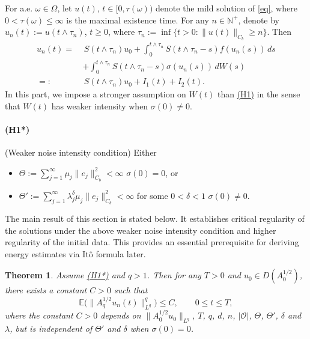 \documentclass[10pt]{article}
\numberwithin{figure}{section}
\numberwithin{equation}{section}
\newtheorem{theorem}{Theorem}[section]
\newcommand{\0}{{\theta}}
\def\w{\omega}
\def\W{\Omega}
\def\8{\infty}
\begin{document}
For a.e. $\w\in\W$, let $u(t)$, $t\in[0,\tau(\w))$ denote the mild solution of \eqref{eq}, where $0<\tau(\w)\le\8$  is  the maximal existence time. For any $n\in \mathbb{N}^+$, denote by $u_n(t):=u(t\wedge\tau_n)$, $t\ge0$, where $\tau_n := \inf\{t > 0 : \|u(t)\|_{C_b} \geq n\}$. Then 
\begin{equation}\label{eq1.1}
\begin{split}u_n(t) =\,&\,S(t\wedge\tau_n)u_0 + \int_0^{t\wedge\tau_n} S(t\wedge\tau_n-s)f(u_n(s))\,ds\\
&+ \int_0^{t\wedge\tau_n} S(t\wedge\tau_n-s)\sigma(u_n(s))\,dW(s)\\
=:&\,S(t\wedge\tau_n)u_0 +I_1(t)+I_2(t).\end{split}\end{equation}
\vs
In this part, we impose a stronger assumption on $W(t)$ than \hyperref[H1]{(H1)} in the sense that $W(t)$ has weaker intensity when $\sigma(0) \neq 0$.
\hypertarget{H}{}\paragraph{(H1*)} \label{H1*} (Weaker noise intensity condition) Either
\begin{itemize}
    \item $\displaystyle \Theta:=\sum_{j=1}^\infty \mu_j\|e_j\|_{C_b}^2<\infty$ \quad{}\quad $\sigma(0)=0$, or
    \item$\displaystyle \Theta':=\sum_{j=1}^\infty \lambda_j^\delta \mu_j\|e_j\|_{C_b}^2<\infty$ for some $0<\delta<1$ \quad{}\quad $\sigma(0)\ne0$.
\end{itemize}


The main result of this section is stated below. It establishes critical regularity of the solutions under the above weaker noise intensity condition and higher regularity of the initial data. This provides an essential prerequisite for deriving energy estimates via It\^o formula later.

\begin{theorem}\label{th2}
Assume \hyperref[H1*]{(H1*)} and $q>1$. Then for any $T>0$ and $u_0\in D(A_0^{1/2})$, there exists a constant $C>0$ such that
$$
\mathbb{E}\big(\|A_q^{1/2}u_n(t)\|_{L^q}^q\big) \le C,\qquad 0\le t\le T,
$$
where the constant $C>0$ depends on $\|A_0^{1/2}u_0\|_{L^q}$, $T$, $q$, $d$, $n$, $|\mathcal O|$, $\Theta$, $\Theta'$, $\delta$ and $\lambda$, but is independent of $\Theta'$ and $\delta$ when $\sigma(0)=0$.
\end{theorem}
\end{document}
